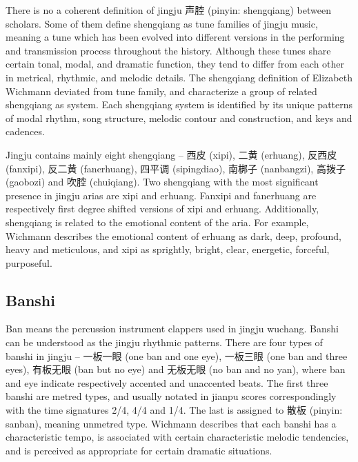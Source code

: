 There is no a coherent definition of jingju 声腔 (pinyin: shengqiang) between scholars. Some of them define shengqiang as tune families of jingju music, meaning a tune which has been evolved into different versions in the performing and transmission process throughout the history. Although these tunes share certain tonal, modal, and dramatic function, they tend to differ from each other in metrical, rhythmic, and melodic details. The shengqiang definition of Elizabeth Wichmann deviated from tune family, and characterize a group of related shengqiang as system. Each shengqiang system is identified by its unique patterns of modal rhythm, song structure, melodic contour and construction, and keys and cadences.  

Jingju contains mainly eight shengqiang -- 西皮 (xipi), 二黄 (erhuang), 反西皮 (fanxipi), 反二黄 (fanerhuang), 四平调 (sipingdiao), 南梆子 (nanbangzi), 高拨子 (gaobozi) and 吹腔 (chuiqiang). Two shengqiang with the most significant presence in jingju arias are xipi and erhuang. Fanxipi and fanerhuang are respectively first degree shifted versions of xipi and erhuang. Additionally, shengqiang is related to the emotional content of the aria. For example, Wichmann describes the emotional content of erhuang as dark, deep, profound, heavy and meticulous, and xipi as sprightly, bright, clear, energetic, forceful, purposeful. 

\subsection{Banshi}\label{sec:banshi}

Ban means the percussion instrument clappers used in jingju wuchang. Banshi can be understood as the jingju rhythmic patterns.  There are four types of banshi in jingju -- 一板一眼 (one ban and one eye), 一板三眼 (one ban and three eyes), 有板无眼 (ban but no eye) and 无板无眼 (no ban and no yan), where ban and eye indicate respectively accented and unaccented beats. The first three banshi are metred types, and usually notated in jianpu scores correspondingly with the time signatures 2/4, 4/4 and 1/4. The last is assigned to 散板 (pinyin: sanban), meaning unmetred type. Wichmann describes that each banshi has a characteristic tempo, is associated with certain characteristic melodic tendencies, and is perceived as appropriate for certain dramatic situations. 

